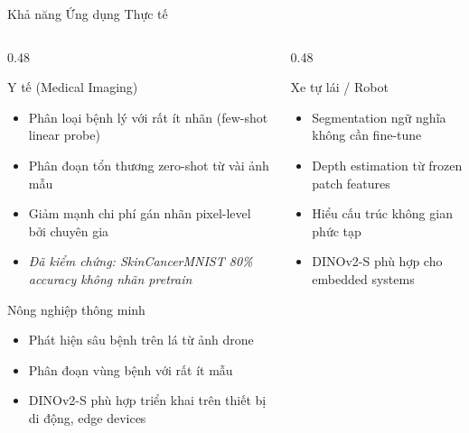 \documentclass[aspectratio=169]{beamer}
\begin{document}
\begin{frame}[t,shrink=15]{Khả năng Ứng dụng Thực tế}
    \begin{columns}[t]
        \begin{column}{0.48\textwidth}
            \begin{block}{Y tế (Medical Imaging)}
                \small
                \begin{itemize}
                    \item Phân loại bệnh lý với rất ít nhãn (few-shot linear probe)
                    \item Phân đoạn tổn thương zero-shot từ vài ảnh mẫu
                    \item Giảm mạnh chi phí gán nhãn pixel-level bởi chuyên gia
                    \item \textit{Đã kiểm chứng: SkinCancerMNIST 80\% accuracy không nhãn pretrain}
                \end{itemize}
            \end{block}
            \vspace{0.2cm}
            \begin{block}{Nông nghiệp thông minh}
                \small
                \begin{itemize}
                    \item Phát hiện sâu bệnh trên lá từ ảnh drone
                    \item Phân đoạn vùng bệnh với rất ít mẫu
                    \item DINOv2-S phù hợp triển khai trên thiết bị di động, edge devices
                \end{itemize}
            \end{block}
        \end{column}
        \begin{column}{0.48\textwidth}
            \begin{block}{Xe tự lái / Robot}
                \small
                \begin{itemize}
                    \item Segmentation ngữ nghĩa không cần fine-tune
                    \item Depth estimation từ frozen patch features
                    \item Hiểu cấu trúc không gian phức tạp
                    \item DINOv2-S phù hợp cho embedded systems

\end{itemize}
\end{block}
\end{column}
\end{columns}
\end{frame}
\end{document}
